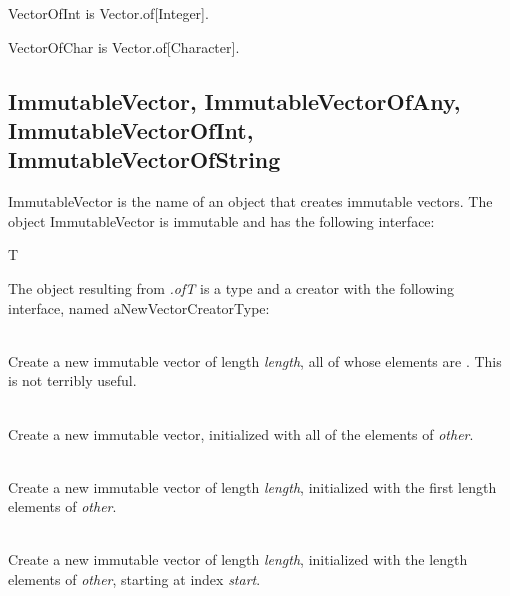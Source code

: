 \label{builtin VectorOfInt}
VectorOfInt is Vector.of[Integer].

\label{builtin VectorOfChar}
VectorOfChar is Vector.of[Character].

\subsection{ImmutableVector, ImmutableVectorOfAny, ImmutableVectorOfInt, ImmutableVectorOfString}
\label{builtin ImmutableVector}

ImmutableVector is the name of an object that creates immutable vectors.
The object
ImmutableVector is immutable and has the following interface:

\begin{desc}
  \item[\kw{function} of\/\LB{}T \CO{} \tn{Type}\/\RB{} \returns{} \/\LB{}aNewVectorCreatorType\/\RB{}] T
\end{desc}

\noindent The object resulting from 
{\it {}.of\/\LB{}T\/\RB{}}
is a type and a creator with the following interface, named 
aNewVectorCreatorType: 

\begin{desc}
  \item[\kw{operation} create\/\LB{}length \CO{} \tn{Integer}\/\RB{} \returns{} \/\LB{}aNewVectorType\/\RB{}]~\\
    Create a new immutable vector of length {\it length}, all of whose
    elements are .  This is not terribly useful.
  \item[\kw{operation} literal\/\LB{}other \CO{} Sequence.of\/\LB{}T\/\RB{}\/\RB{} \returns{} \/\LB{}aNewVectorType\/\RB{}]~\\
    Create a new immutable vector, initialized with all of the elements of 
    {\it other}.
  \item[\kw{operation} literal\/\LB{}other \CO{} Sequence.of\/\LB{}T\/\RB{}, length \CO{} \tn{Integer}\/\RB{} \returns{} \/\LB{}aNewVectorType\/\RB{}]~\\
    Create a new immutable vector of length {\it length}, initialized with
    the first length elements of {\it other}.
  \item[\kw{operation} literal\/\LB{}other \CO{} Sequence.of\/\LB{}T\/\RB{}, start \CO{} Integer, length \CO{} \tn{Integer}\/\RB{} \returns{} \/\LB{}aNewVectorType\/\RB{}]~\\
    Create a new immutable vector of length {\it length}, initialized with
    the length elements of {\it other}, starting at index {\it start}.
\end{desc}


